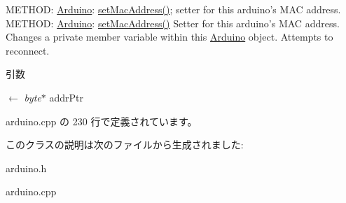 METHOD: \hyperlink{classArduino}{Arduino}: \hyperlink{classArduino_ab4692c5d510b6b5583e703ecd32bf778_ab4692c5d510b6b5583e703ecd32bf778}{setMacAddress()}; setter for this arduino's MAC address. METHOD: \hyperlink{classArduino}{Arduino}: \hyperlink{classArduino_ab4692c5d510b6b5583e703ecd32bf778_ab4692c5d510b6b5583e703ecd32bf778}{setMacAddress()} Setter for this arduino's MAC address. Changes a private member variable within this \hyperlink{classArduino}{Arduino} object. Attempts to reconnect.


\begin{DoxyParams}{引数}
\item[\mbox{$\leftarrow$} {\em byte$\ast$}]addrPtr \end{DoxyParams}


 arduino.cpp の 230 行で定義されています。

このクラスの説明は次のファイルから生成されました:\begin{DoxyCompactItemize}
\item 
arduino.h\item 
arduino.cpp\end{DoxyCompactItemize}
